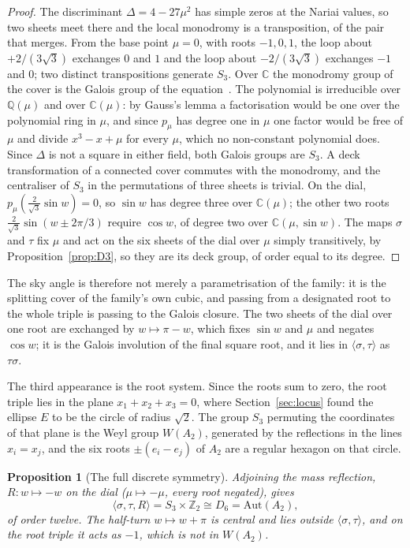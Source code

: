 \documentclass[11pt]{article}
\theoremstyle{plain}
\newtheorem{proposition}[theorem]{Proposition}
\theoremstyle{definition}
\theoremstyle{remark}
\begin{document}
\begin{proof}
The discriminant $\Delta=4-27\mu^{2}$ has simple zeros at the Nariai values, so two sheets meet there and the local
monodromy is a transposition, of the pair that merges. From the base point $\mu=0$, with roots $-1,0,1$, the
loop about $+2/(3\sqrt3)$ exchanges $0$ and $1$ and the loop about $-2/(3\sqrt3)$ exchanges $-1$ and $0$; two distinct
transpositions generate $S_{3}$. Over $\mathbb{C}$ the monodromy group of the cover is the Galois group of the
equation~\cite{Harris1979}. The polynomial is irreducible over $\mathbb{Q}(\mu)$ and over $\mathbb{C}(\mu)$: by Gauss's lemma a
factorisation would be one over the polynomial ring in $\mu$, and since $p_{\mu}$ has degree one in $\mu$ one factor
would be free of $\mu$ and divide $x^{3}-x+\mu$ for every $\mu$, which no non-constant polynomial does. Since $\Delta$ is
not a square in either field, both Galois groups are $S_{3}$. A deck transformation
of a connected cover commutes with the monodromy, and the centraliser of $S_{3}$ in the permutations of three
sheets is trivial. On the dial, $p_{\mu}(\tfrac{2}{\sqrt3}\sin w)=0$, so $\sin w$ has degree three over $\mathbb{C}(\mu)$; the
other two roots $\tfrac{2}{\sqrt3}\sin(w\pm2\pi/3)$ require $\cos w$, of degree two over $\mathbb{C}(\mu,\sin w)$. The maps
$\sigma$ and $\tau$ fix $\mu$ and act on the six sheets of the dial over $\mu$ simply transitively, by
Proposition~\ref{prop:D3}, so they are its deck group, of order equal to its degree.
\end{proof}

The sky angle is therefore not merely a parametrisation of the family: it is the splitting cover of the family's
own cubic, and passing from a designated root to the whole triple is passing to the Galois closure. The two
sheets of the dial over one root are exchanged by $w\mapsto\pi-w$, which fixes $\sin w$ and $\mu$ and negates
$\cos w$; it is the Galois involution of the final square root, and it lies in $\langle\sigma,\tau\rangle$ as
$\tau\sigma$.

The third appearance is the root system. Since the roots sum to zero, the root triple lies in the plane
$x_{1}+x_{2}+x_{3}=0$, where Section~\ref{sec:locus} found the ellipse $E$ to be the circle of radius $\sqrt2$. The
group $S_{3}$ permuting the coordinates of that plane is the Weyl group $W(A_{2})$, generated by the reflections
in the lines $x_{i}=x_{j}$, and the six roots $\pm(e_{i}-e_{j})$ of $A_{2}$ are a regular hexagon on that circle.

\begin{proposition}[The full discrete symmetry]\label{prop:aut}
Adjoining the mass reflection, $R:w\mapsto-w$ on the dial ($\mu\mapsto-\mu$, every root negated), gives
\[
\langle\sigma,\tau,R\rangle=S_{3}\times\mathbb{Z}_{2}\cong D_{6}=\mathrm{Aut}(A_{2}),
\]
of order twelve. The half-turn $w\mapsto w+\pi$ is central and lies outside $\langle\sigma,\tau\rangle$, and on the
root triple it acts as $-1$, which is not in $W(A_{2})$.
\end{proposition}
\end{document}
